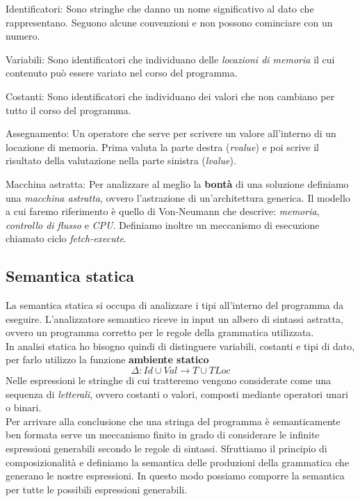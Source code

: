 \documentclass{article}
\begin{document}
\begin{dfn}{Identificatori: }
  Sono stringhe che danno un nome significativo al dato che rappresentano.
  Seguono alcune convenzioni e non possono cominciare con un numero.
\end{dfn}

\begin{dfn}{Variabili: }
  Sono identificatori che individuano delle \emph{locazioni di memoria} il cui contenuto può essere variato nel corso del programma.
\end{dfn}
\begin{dfn}{Costanti: }
  Sono identificatori che individuano dei valori che non cambiano per tutto il corso del programma.
\end{dfn}

\begin{dfn}{Assegnamento: }
  Un operatore che serve per scrivere un valore all'interno di un locazione di memoria. Prima valuta la parte destra (\emph{rvalue}) e poi scrive il risultato della valutazione nella parte sinistra (\emph{lvalue}).
\end{dfn}

\begin{dfn}{Macchina astratta: }
  Per analizzare al meglio la \textbf{bontà} di una soluzione definiamo una \emph{macchina astratta}, ovvero l'astra\-zione di un'architettura generica. Il modello a cui faremo riferimento è quello di Von-Neumann che descrive: \emph{memoria}, \emph{controllo di flusso} e \emph{CPU}.
  Definiamo inoltre un meccanismo di esecuzione chiamato ciclo \emph{fetch-execute}.
\end{dfn}

\pagebreak

\subsection{Semantica statica}
La semantica statica si occupa di analizzare i tipi all'interno del programma da eseguire. L'analiz\-zatore semantico riceve in input un albero di sintassi astratta, ovvero un programma corretto per le regole della grammatica utilizzata. \\
In analisi statica ho bisogno quindi di distinguere variabili, costanti e tipi di dato, per farlo utilizzo la funzione \textbf{ambiente statico}
\[\Delta: Id \cup Val \rightarrow T \cup TLoc\]
Nelle espressioni le stringhe di cui tratteremo vengono considerate come una sequenza di \emph{letterali}, ovvero costanti o valori, composti mediante operatori unari o binari. \\
Per arrivare alla conclusione che una stringa del programma è semanticamente ben formata serve un meccanismo finito in grado di considerare le infinite espressioni generabili secondo le regole di sintassi. Sfruttiamo il principio di composizionalità e definiamo la semantica delle produzioni della grammatica che generano le nostre espressioni. In questo modo possiamo comporre la semantica per tutte le possibili espressioni generabili.
\end{document}
